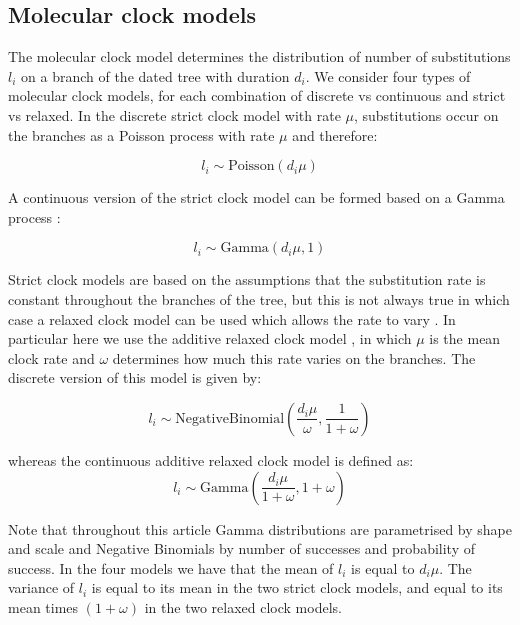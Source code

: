 \documentclass{article}
\begin{document}
\subsection*{Molecular clock models}

The molecular clock model determines the distribution of number of substitutions $l_i$ on a branch of the dated
tree with duration $d_i$. We consider four types of molecular clock models, for each combination of discrete
vs continuous and strict vs relaxed. In the discrete strict clock
model \citep{Zuckerkandl1962} with rate $\mu$,
substitutions occur on the branches as a Poisson process with rate $\mu$ and therefore:

\begin{equation}
l_i \sim \mathrm{Poisson}(d_i \mu)
\label{eq:sc}
\end{equation}

A continuous version of the strict clock model can be formed based on a Gamma process \citep{Didelot2021}:

\begin{equation}
l_i \sim \mathrm{Gamma}(d_i \mu,1)
\label{eq:csc}
\end{equation}

Strict clock models are based on the assumptions that the substitution rate is constant throughout the branches
of the tree, but this is not always true in which case a relaxed clock model can be used which allows
the rate to vary \citep{Drummond2006}. In particular here we use the additive relaxed clock model \citep{Didelot2021},
in which $\mu$ is the mean clock rate and $\omega$ determines how much this rate varies on the branches.
The discrete version of this model is given by: 

\begin{equation}
l_i \sim \mathrm{NegativeBinomial}\left(\frac{d_i \mu}{\omega},\frac{1}{1+\omega}\right)
\label{eq:arc}
\end{equation}

whereas the continuous additive relaxed clock model is defined as:
\begin{equation}
l_i \sim \mathrm{Gamma}\left(\frac{d_i \mu}{1+\omega},1+\omega\right)
\label{eq:carc}
\end{equation}

Note that throughout this article Gamma distributions are parametrised by shape and scale and Negative Binomials 
by number of successes and probability of success. In the four models we have that the mean of $l_i$ is equal to
$d_i \mu$. The variance of $l_i$ is equal to its mean in the two strict clock models, and equal to its mean 
times $(1+\omega)$ in the two relaxed clock models.
\end{document}
